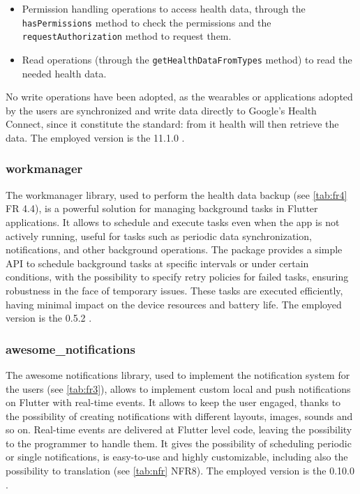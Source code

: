 \begin{itemize}[nosep] %
    \item Permission handling operations to access health data, through the \texttt{hasPermissions} method to check the permissions and the \texttt{requestAuthorization} method to request them.
    \item Read operations (through the \texttt{getHealthDataFromTypes} method) to read the needed health data.
\end{itemize}

\noindent No write operations have been adopted, as the wearables or applications adopted by the users are synchronized and write data directly to Google's Health Connect, since it constitute the standard: from it health will then retrieve the data. The employed version is the 11.1.0 \cite{Health}.

\subsubsection{workmanager}
The workmanager library, used to perform the health data backup (see \cref{tab:fr4} FR 4.4), is a powerful solution for managing background tasks in Flutter applications. It allows to schedule and execute tasks even when the app is not actively running, useful for tasks such as periodic data synchronization, notifications, and other background operations. The package provides a simple API to schedule background tasks at specific intervals or under certain conditions, with the possibility to specify retry policies for failed tasks, ensuring robustness in the face of temporary issues. These tasks are executed efficiently, having minimal impact on the device resources and battery life. The employed version is the 0.5.2 \cite{Workmanager}.
\subsubsection{awesome\_notifications}
The awesome notifications library, used to implement the notification system for the users (see \cref{tab:fr3}), allows to implement custom local and push notifications on Flutter with real-time events. It allows to keep the user engaged, thanks to the possibility of creating notifications with different layouts, images, sounds and so on. Real-time events are delivered at Flutter level code, leaving the possibility to the programmer to handle them. It gives the possibility of scheduling periodic or single notifications, is easy-to-use and highly customizable, including also the possibility to translation (see \cref{tab:nfr} NFR8). The employed version is the 0.10.0 \cite{AwesomeNotifications}.
\vspace{5ex}
